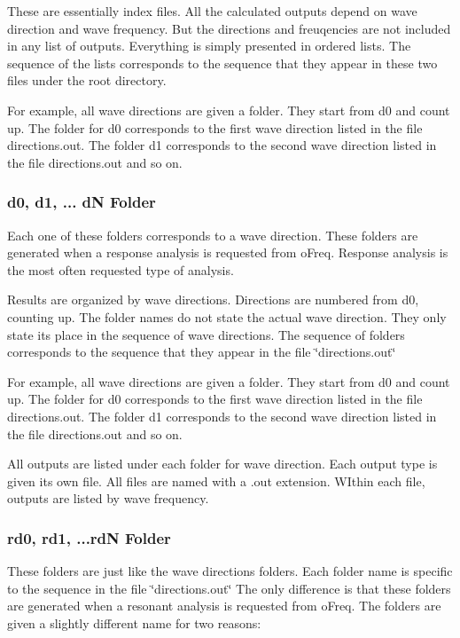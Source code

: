 These are essentially index files. All the calculated outputs depend on wave direction and wave frequency. But the directions and freuqencies are not included in any list of outputs. Everything is simply presented in ordered lists. The sequence of the lists corresponds to the sequence that they appear in these two files under the root directory.

For example, all wave directions are given a folder. They start from d0 and count up. The folder for d0 corresponds to the first wave direction listed in the file directions.\-out. The folder d1 corresponds to the second wave direction listed in the file directions.\-out and so on.\hypertarget{directory_structure_dfolder}{}\subsubsection{d0, d1, ... d\-N Folder}\label{directory_structure_dfolder}
Each one of these folders corresponds to a wave direction. These folders are generated when a response analysis is requested from o\-Freq. Response analysis is the most often requested type of analysis.

Results are organized by wave directions. Directions are numbered from d0, counting up. The folder names do not state the actual wave direction. They only state its place in the sequence of wave directions. The sequence of folders corresponds to the sequence that they appear in the file \char`\"{}directions.\-out\char`\"{}

For example, all wave directions are given a folder. They start from d0 and count up. The folder for d0 corresponds to the first wave direction listed in the file directions.\-out. The folder d1 corresponds to the second wave direction listed in the file directions.\-out and so on.

All outputs are listed under each folder for wave direction. Each output type is given its own file. All files are named with a .out extension. W\-Ithin each file, outputs are listed by wave frequency.\hypertarget{directory_structure_rdfolder}{}\subsubsection{rd0, rd1, ...\-rd\-N Folder}\label{directory_structure_rdfolder}
These folders are just like the wave directions folders. Each folder name is specific to the sequence in the file \char`\"{}directions.\-out\char`\"{} The only difference is that these folders are generated when a resonant analysis is requested from o\-Freq. The folders are given a slightly different name for two reasons\-:


